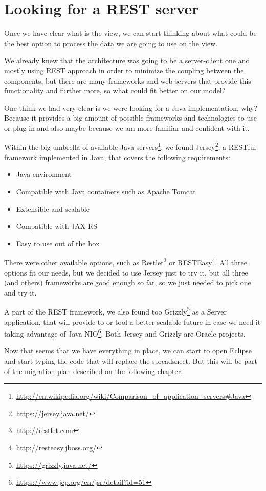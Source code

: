 \section{Looking for a REST server}
Once we have clear what is the view, we can start thinking about what could be
the best option to process the data we are going to use on the view.

We already knew that the architecture was going to be a server-client one and
mostly using REST approach in order to minimize the coupling between the
components, but there are many frameworks and web servers that provide this
functionality and further more, so what could fit better on our model?

One think we had very clear is we were looking for a Java implementation, why?
Because it provides a big amount of possible frameworks and technologies to
use or plug in and also maybe because we am more familiar and confident
with it.

Within the big umbrella of available Java servers\footnote{\url{http://en.wikipedia.org/wiki/Comparison\_of\_application\_servers\#Java}},
we found Jersey\footnote{\url{https://jersey.java.net/}}, a
RESTful framework implemented in Java, that covers the following
requirements:
\begin{itemize}
  \item Java environment
  \item Compatible with Java containers such as Apache Tomcat 
  \item Extensible and scalable
  \item Compatible with JAX-RS
  \item Easy to use out of the box
\end{itemize}

There were other available options, such as
Restlet\footnote{\url{http://restlet.com}} or
RESTEasy\footnote{\url{http://resteasy.jboss.org/}}. All three options fit our
needs, but we decided to use Jersey just to try it, but all three (and others)
frameworks are good enough so far, so we just needed to pick one and try it.

A part of the REST framework, we also found too Grizzly\footnote{\url{https://grizzly.java.net/}} as a Server application, that will
provide to or tool a better scalable future in case we need it taking
advantage of Java NIO\footnote{\url{https://www.jcp.org/en/jsr/detail?id=51}}.
Both Jersey and Grizzly are Oracle projects.

Now that seems that we have everything in place, we can start to open Eclipse
and start typing the code that will replace the spreadsheet. But this will be
part of the migration plan described on the following chapter.

